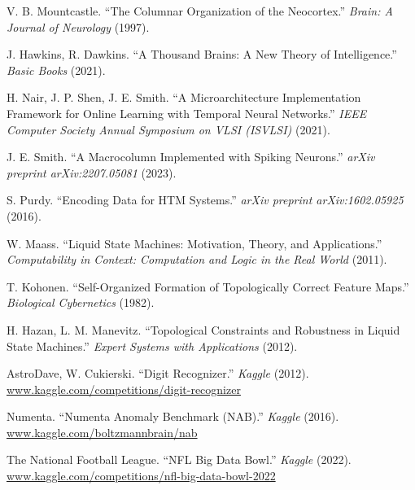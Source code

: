 \begin{thebibliography}{00}

    V. B. Mountcastle.
    ``The Columnar Organization of the Neocortex.''
    \textit{Brain: A Journal of Neurology}
    (1997).

    J. Hawkins, R. Dawkins.
    ``A Thousand Brains: A New Theory of Intelligence.''
    \textit{Basic Books}
    (2021).

    H. Nair, J. P. Shen, J. E. Smith.
    ``A Microarchitecture Implementation Framework for Online Learning with Temporal Neural Networks.''
    \textit{IEEE Computer Society Annual Symposium on VLSI (ISVLSI)}
    (2021).

    J. E. Smith.
    ``A Macrocolumn Implemented with Spiking Neurons.''
    \textit{arXiv preprint arXiv:2207.05081}
    (2023).

    S. Purdy.
    ``Encoding Data for HTM Systems.''
    \textit{arXiv preprint arXiv:1602.05925}
    (2016).

    W. Maass.
    ``Liquid State Machines: Motivation, Theory, and Applications.''
    \textit{Computability in Context: Computation and Logic in the Real World}
    (2011).

    T. Kohonen.
    ``Self-Organized Formation of Topologically Correct Feature Maps.''
    \textit{Biological Cybernetics}
    (1982).

    H. Hazan, L. M. Manevitz.
    ``Topological Constraints and Robustness in Liquid State Machines.''
    \textit{Expert Systems with Applications}
    (2012).

    AstroDave, W. Cukierski.
    ``Digit Recognizer.''
    \textit{Kaggle}
    (2012).
    \url{www.kaggle.com/competitions/digit-recognizer}

    Numenta.
    ``Numenta Anomaly Benchmark (NAB).''
    \textit{Kaggle}
    (2016).
    \url{www.kaggle.com/boltzmannbrain/nab}

    The National Football League.
    ``NFL Big Data Bowl.''
    \textit{Kaggle}
    (2022).
    \url{www.kaggle.com/competitions/nfl-big-data-bowl-2022}

\end{thebibliography}